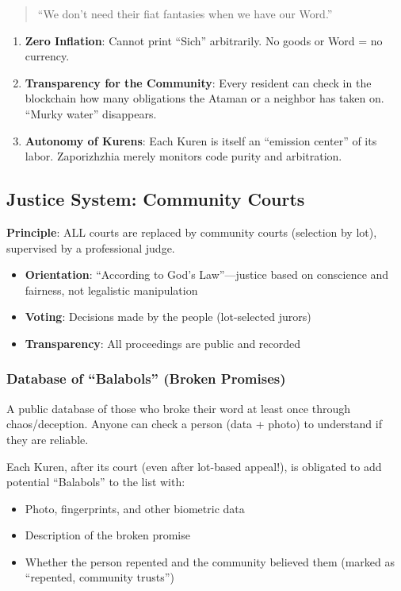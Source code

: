 \documentclass[11pt,a4paper]{article}
\theoremstyle{definition}
\theoremstyle{remark}
\begin{document}
\begin{quote}
``We don't need their fiat fantasies when we have our Word.''
\end{quote}

\begin{enumerate}
\item \textbf{Zero Inflation}: Cannot print ``Sich'' arbitrarily. No goods or Word = no currency.
\item \textbf{Transparency for the Community}: Every resident can check in the blockchain how many obligations the Ataman or a neighbor has taken on. ``Murky water'' disappears.
\item \textbf{Autonomy of Kurens}: Each Kuren is itself an ``emission center'' of its labor. Zaporizhzhia merely monitors code purity and arbitration.
\end{enumerate}

\subsection{Justice System: Community Courts}

\textbf{Principle}: ALL courts are replaced by community courts (selection by lot), supervised by a professional judge.

\begin{itemize}
\item \textbf{Orientation}: ``According to God's Law''—justice based on conscience and fairness, not legalistic manipulation
\item \textbf{Voting}: Decisions made by the people (lot-selected jurors)
\item \textbf{Transparency}: All proceedings are public and recorded
\end{itemize}

\subsubsection{Database of ``Balabols'' (Broken Promises)}

A public database of those who broke their word at least once through chaos/deception. Anyone can check a person (data + photo) to understand if they are reliable.

Each Kuren, after its court (even after lot-based appeal!), is obligated to add potential ``Balabols'' to the list with:
\begin{itemize}
\item Photo, fingerprints, and other biometric data
\item Description of the broken promise
\item Whether the person repented and the community believed them (marked as ``repented, community trusts'')
\end{itemize}
\end{document}
